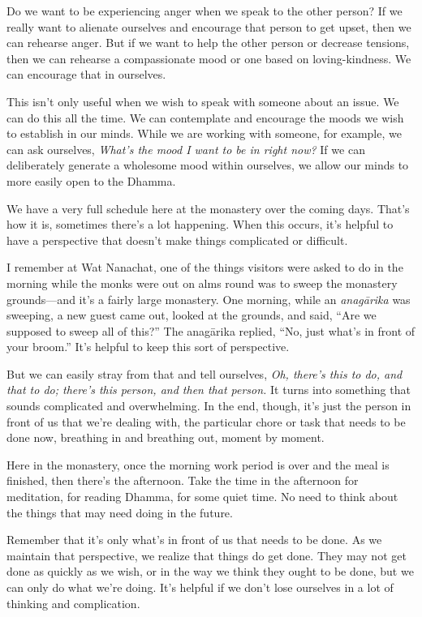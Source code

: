 Do we want to be experiencing anger when we speak to the other person? 
If we really want to alienate ourselves and encourage that person to 
get upset, then we can rehearse anger. But if we want to help the other 
person or decrease tensions, then we can rehearse a compassionate mood 
or one based on loving-kindness. We can encourage that in ourselves.

This isn't only useful when we wish to speak with someone about an 
issue. We can do this all the time. We can contemplate and encourage 
the moods we wish to establish in our minds. While we are working with 
someone, for example, we can ask ourselves, \emph{What's the mood I 
want to be in right now?} If we can deliberately generate a wholesome 
mood within ourselves, we allow our minds to more easily open to the 
Dhamma.


We have a very full schedule here at the monastery over the coming 
days. That's how it is, sometimes there's a lot happening. When this 
occurs, it's helpful to have a perspective that doesn't make things 
complicated or difficult.

I remember at Wat Nanachat, one of the things visitors were asked to do 
in the morning while the monks were out on alms round was to sweep the 
monastery grounds---and it's a fairly large monastery. One morning, 
while an \emph{anagārika} was sweeping, a new guest came out, looked 
at the grounds, and said, ``Are we supposed to sweep all of this?'' The 
anagārika replied, ``No, just what's in front of your broom.'' It's 
helpful to keep this sort of perspective.

But we can easily stray from that and tell ourselves, \emph{Oh, there's 
this to do, and that to do; there's this person, and then that person.} 
It turns into something that sounds complicated and overwhelming. In 
the end, though, it's just the person in front of us that we're dealing 
with, the particular chore or task that needs to be done now, breathing 
in and breathing out, moment by moment.

Here in the monastery, once the morning work period is over and the 
meal is finished, then there's the afternoon. Take the time in the 
afternoon for meditation, for reading Dhamma, for some quiet time. No 
need to think about the things that may need doing in the future.

Remember that it's only what's in front of us that needs to be done. As 
we maintain that perspective, we realize that things do get done. They 
may not get done as quickly as we wish, or in the way we think they 
ought to be done, but we can only do what we're doing. It's helpful if 
we don't lose ourselves in a lot of thinking and complication.

